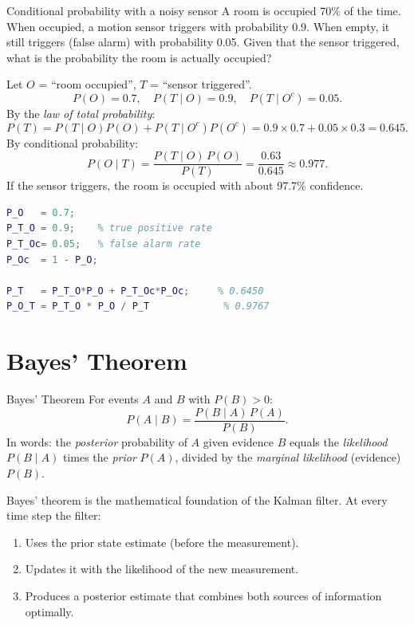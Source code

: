 \begin{examplebox}{Conditional probability with a noisy sensor}
A room is occupied 70\% of the time.  When occupied, a motion sensor
triggers with probability 0.9.  When empty, it still triggers
(false alarm) with probability 0.05.  Given that the sensor triggered,
what is the probability the room is actually occupied?

\solution
Let $O$ = ``room occupied'', $T$ = ``sensor triggered''.
\[
  P(O) = 0.7,\quad P(T \mid O) = 0.9,\quad P(T \mid O^c) = 0.05.
\]
By the \emph{law of total probability}:
\[
  P(T) = P(T\mid O)P(O) + P(T\mid O^c)P(O^c)
       = 0.9\times0.7 + 0.05\times0.3 = 0.645.
\]
By conditional probability:
\[
  P(O\mid T) = \frac{P(T\mid O)\,P(O)}{P(T)}
             = \frac{0.63}{0.645} \approx 0.977.
\]
If the sensor triggers, the room is occupied with about 97.7\%
confidence.

\begin{lstlisting}[language=Matlab]
P_O   = 0.7;
P_T_O = 0.9;    % true positive rate
P_T_Oc= 0.05;   % false alarm rate
P_Oc  = 1 - P_O;

P_T   = P_T_O*P_O + P_T_Oc*P_Oc;     % 0.6450
P_O_T = P_T_O * P_O / P_T             % 0.9767
\end{lstlisting}
\end{examplebox}

\section{Bayes' Theorem}
\label{sec:app_bayes}

\begin{defnbox}{Bayes' Theorem}
For events $A$ and $B$ with $P(B) > 0$:
\[
  {P(A \mid B) = \frac{P(B \mid A)\,P(A)}{P(B)}}.
\]
In words: the \emph{posterior} probability of $A$ given evidence $B$
equals the \emph{likelihood} $P(B\mid A)$ times the \emph{prior}
$P(A)$, divided by the \emph{marginal likelihood} (evidence) $P(B)$.
\end{defnbox}

Bayes' theorem is the mathematical foundation of the Kalman filter.
At every time step the filter:
\begin{enumerate}[noitemsep]
  \item Uses the prior state estimate (before the measurement).
  \item Updates it with the likelihood of the new measurement.
  \item Produces a posterior estimate that combines both sources of
        information optimally.
\end{enumerate}

